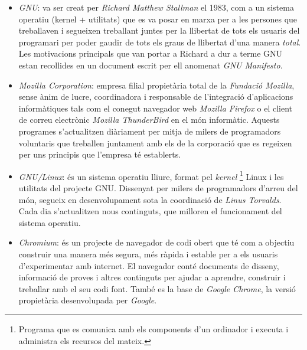 \begin{itemize}

\item \emph{GNU}: va ser creat per \emph{Richard Matthew Stallman} el 1983, com a un sistema operatiu (kernel + utilitats) que es va posar en marxa per a les persones que treballaven i segueixen treballant juntes per la llibertat de tots els usuaris del programari per poder gaudir de tots els graus de llibertat d'una manera \emph{total}. Les motivacions principals que van portar a Richard a dur a terme GNU estan recollides en un document escrit per ell anomenat \emph{GNU Manifesto}. \cite{GNUExit} \cite{GNUExitII} \cite{GNUMan} \cite{GvsM}

\item \emph{Mozilla Corporation}: empresa filial propietària total de la \emph{Fundació Mozilla}, sense ànim de lucre, coordinadora i responsable de l'integració d'aplicacions informàtiques tals com el conegut navegador web \emph{Mozilla Firefox} o el client de correu electrònic \emph{Mozilla ThunderBird} en el món informàtic. Aquests programes s'actualitzen diàriament per mitja de milers de programadors voluntaris que treballen juntament amb els de la corporació que es regeixen per uns principis que l'empresa té establerts. \cite{MozExit} \cite{MozExitII} \cite{MozFesto}

\item \emph{GNU/Linux}: és un sistema operatiu lliure, format pel \emph{kernel} \footnote{Programa que es comunica amb els components d'un ordinador i executa i administra els recursos del mateix.} Linux i les utilitats del projecte GNU. Dissenyat per milers de programadors d'arreu del món, segueix en desenvolupament sota la coordinació de \emph{Linus Torvalds}. Cada dia s'actualitzen nous continguts, que milloren el funcionament del sistema operatiu. \cite{LinExit} \cite{POSIX}

\item \emph{Chromium}: és un projecte de navegador de codi obert que té com a objectiu construir una manera més segura, més ràpida i estable per a els usuaris d'experimentar amb internet. El navegador conté documents de disseny, informació de proves i altres continguts per ajudar a aprendre, construir i treballar amb el seu codi font. També es la base de \emph{Google Chrome}, la versió propietària desenvolupada per \emph{Google}. \cite{Chrom} 
\end{itemize}












